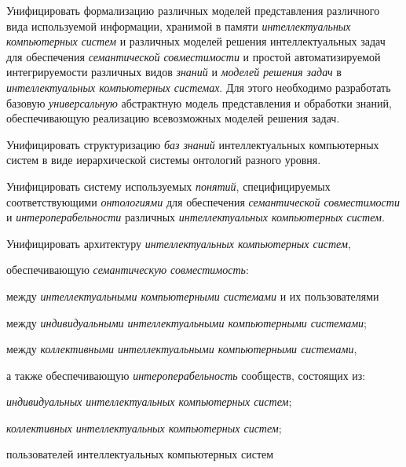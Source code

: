 \begin{textitemize}
	\item  
	Унифицировать формализацию различных моделей представления различного вида используемой информации, хранимой в памяти \textit{интеллектуальных компьютерных систем} и различных моделей решения интеллектуальных задач для обеспечения \textit{семантической совместимости} и простой автоматизируемой интегрируемости различных видов \textit{знаний} и \textit{моделей решения задач} в \textit{интеллектуальных компьютерных системах}. Для этого необходимо разработать базовую \textit{универсальную} абстрактную модель представления и обработки знаний, обеспечивающую реализацию всевозможных моделей решения задач.
	\item  
	Унифицировать структуризацию \textit{баз знаний} интеллектуальных компьютерных систем в виде иерархической системы онтологий разного уровня.
	\item  
	Унифицировать систему используемых \textit{понятий}, специфицируемых соответствующими \textit{онтологиями} для обеспечения \textit{семантической совместимости} и \textit{интероперабельности} различных \textit{интеллектуальных компьютерных систем}.
	\item  
	Унифицировать архитектуру \textit{интеллектуальных компьютерных систем}, 
	\begin{textitemize}
		\item обеспечивающую \textit{семантическую совместимость}:
		\begin{textitemize}
			\item между \textit{интеллектуальными компьютерными системами} и их пользователями
			\item между \textit{индивидуальными интеллектуальными компьютерными системами};
			\item между \textit{коллективными интеллектуальными компьютерными системами},
		\end{textitemize}
		\item а также обеспечивающую \textit{интероперабельность} сообществ, состоящих из:
		\begin{textitemize}
			\item \textit{индивидуальных интеллектуальных компьютерных систем};
			\item \textit{коллективных интеллектуальных компьютерных систем};
			\item пользователей интеллектуальных компьютерных систем
		\end{textitemize}
	\end{textitemize}

\end{textitemize}
